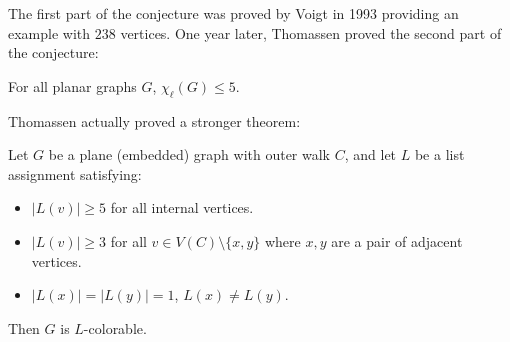 The first part of the conjecture was proved by Voigt \cite{voigt1993} in 1993 providing an 
example with $238$ vertices. One year later, Thomassen proved the second part of the conjecture:

\begin{theorem}
\label{thomassentheorem}
For all planar graphs $G$, $\chi_{\ell}(G) \leq 5$.
\end{theorem}

Thomassen actually proved a stronger theorem: 

\begin{theorem}
\label{thomassenstrongertheorem}
	Let $G$ be a plane (embedded) graph with outer walk $C$, and let $L$ be a list assignment satisfying:
\begin{itemize}
	\item $|L(v)| \geq 5$ for all internal vertices.
	\item $|L(v)| \geq 3$ for all $v \in V(C) \setminus \{x, y\}$ where $x, y$ are a pair of adjacent vertices.
	\item $|L(x)| = |L(y)| = 1$, $L(x) \neq L(y)$. 
\end{itemize}	
	Then $G$ is $L$-colorable.
\end{theorem}

